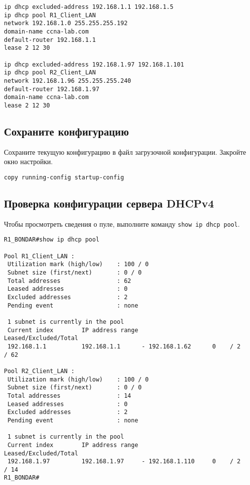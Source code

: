 \begin{verbatim}
ip dhcp excluded-address 192.168.1.1 192.168.1.5
ip dhcp pool R1_Client_LAN
network 192.168.1.0 255.255.255.192
domain-name ccna-lab.com
default-router 192.168.1.1
lease 2 12 30

ip dhcp excluded-address 192.168.1.97 192.168.1.101
ip dhcp pool R2_Client_LAN
network 192.168.1.96 255.255.255.240
default-router 192.168.1.97
domain-name ccna-lab.com
lease 2 12 30
\end{verbatim}

\subsection{Сохраните конфигурацию}
Сохраните текущую конфигурацию в файл загрузочной конфигурации.
Закройте окно настройки.

\begin{verbatim}
copy running-config startup-config
\end{verbatim}

\subsection{Проверка конфигурации сервера DHCPv4}

Чтобы просмотреть сведения о пуле,
выполните команду \texttt{show ip dhcp pool}.

\begin{verbatim}
R1_BONDAR#show ip dhcp pool 

Pool R1_Client_LAN :
 Utilization mark (high/low)    : 100 / 0
 Subnet size (first/next)       : 0 / 0 
 Total addresses                : 62
 Leased addresses               : 0
 Excluded addresses             : 2
 Pending event                  : none

 1 subnet is currently in the pool
 Current index        IP address range                    Leased/Excluded/Total
 192.168.1.1          192.168.1.1      - 192.168.1.62      0    / 2     / 62

Pool R2_Client_LAN :
 Utilization mark (high/low)    : 100 / 0
 Subnet size (first/next)       : 0 / 0 
 Total addresses                : 14
 Leased addresses               : 0
 Excluded addresses             : 2
 Pending event                  : none

 1 subnet is currently in the pool
 Current index        IP address range                    Leased/Excluded/Total
 192.168.1.97         192.168.1.97     - 192.168.1.110     0    / 2     / 14
R1_BONDAR#
\end{verbatim}

